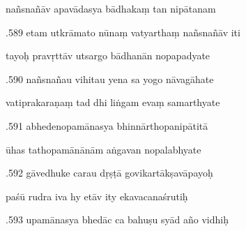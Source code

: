 \documentclass[article,12pt,a4paper]{memoir}%
\newcounter{parCount}
\begin{document}
	  
	  \pstart \leavevmode%
	nañsnañāv apavādasya bādhakaṃ tan nipātanam 
	{}
	\pend%
      

	  
	  \pstart {}.589 etam utkrāmato nūnaṃ vatyarthaṃ nañsnañāv iti 
	{}
	\pend%
      

	  
	  \pstart \leavevmode%
	tayoḥ pravṛttāv utsargo bādhanān nopapadyate 
	{}
	\pend%
      

	  
	  \pstart {}.590 nañsnañau vihitau yena sa yogo nāvagāhate 
	{}
	\pend%
      

	  
	  \pstart \leavevmode%
	vatiprakaraṇaṃ tad dhi liṅgam evaṃ samarthyate 
	{}
	\pend%
      

	  
	  \pstart {}.591 abhedenopamānasya bhinnārthopanipātitā 
	{}
	\pend%
      

	  
	  \pstart \leavevmode%
	ūhas tathopamānānām aṅgavan nopalabhyate 
	{}
	\pend%
      

	  
	  \pstart {}.592 gāvedhuke carau dṛṣṭā govikartākṣavāpayoḥ 
	{}
	\pend%
      

	  
	  \pstart \leavevmode%
	paśū rudra iva hy etāv ity ekavacanaśrutiḥ 
	{}
	\pend%
      

	  
	  \pstart {}.593 upamānasya bhedāc ca bahuṣu syād año vidhiḥ 
	{}
	\pend%
      
\end{document}

